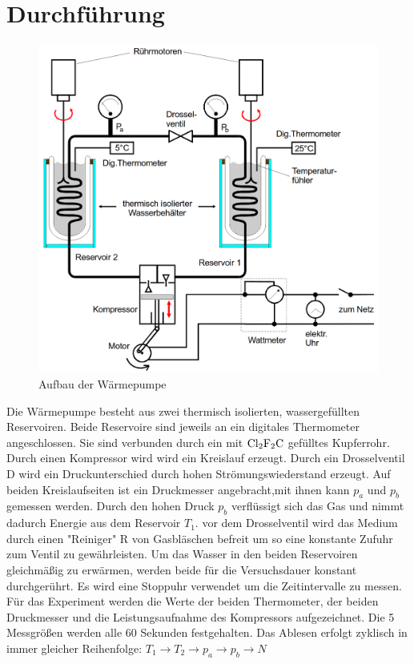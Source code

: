 \section{Durchführung}
\label{sec:Durchführung}

\begin{figure}[H]\label{fig:waermepumpe}
    \centering
    \includegraphics[width=1\textwidth]{content/Aufbau_Waermepumpe.png}
    \caption{Aufbau der Wärmepumpe\protect\footnotemark}
\end{figure}

Die Wärmepumpe besteht aus zwei thermisch isolierten, wassergefüllten Reservoiren. Beide Reservoire sind jeweils an ein digitales
Thermometer angeschlossen. Sie sind verbunden durch ein mit $\ce{Cl2F2C}$ gefülltes Kupferrohr. Durch einen Kompressor wird wird 
ein Kreislauf erzeugt. Durch ein Drosselventil D wird ein Druckunterschied durch hohen Strömungswiederstand erzeugt. Auf beiden 
Kreislaufseiten ist ein Druckmesser angebracht,mit ihnen kann $p_a$ und $p_b$ gemessen werden. Durch den hohen Druck $p_b$
verflüssigt sich das Gas und nimmt dadurch Energie aus dem Reservoir $T_1$. vor dem Drosselventil wird das Medium durch einen
"Reiniger" R von Gasbläschen befreit um so eine konstante Zufuhr zum Ventil zu gewährleisten. Um das Wasser in den beiden Reservoiren
gleichmäßig zu erwärmen, werden beide für die Versuchsdauer konstant durchgerührt. Es wird eine Stoppuhr verwendet um die Zeitintervalle zu messen.\\

Für das Experiment werden die Werte der beiden Thermometer, der beiden Druckmesser und die Leistungsaufnahme des Kompressors aufgezeichnet.
Die 5 Messgrößen werden alle 60 Sekunden festgehalten. Das Ablesen erfolgt zyklisch in immer gleicher Reihenfolge: 
$T_1 → T_2 → p_a → p_b → N$

\newpage